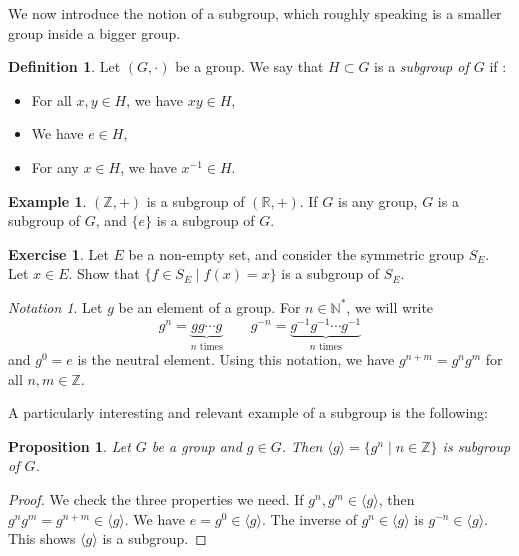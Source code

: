 \documentclass{book}
\newcommand{\N}{\mathbb{N}}
\newcommand{\Z}{\mathbb{Z}}
\newcommand{\R}{\mathbb{R}}
\theoremstyle{plain}
\newtheorem{proposition}[theorem]{Proposition}
\theoremstyle{definition}
\newtheorem{definition}[theorem]{Definition}
\newtheorem{example}[theorem]{Example}
\newtheorem{exercise}{Exercise}[section]
\theoremstyle{remark}
\newtheorem*{notation}{Notation}
\begin{document}
We now introduce the notion of a subgroup, which roughly speaking is a smaller group inside a bigger group. 

\begin{definition}
    Let $(G,\cdot)$ be a group. We say that $H \subset G$ is a \emph{subgroup of $G$} if :
    \begin{itemize}
        \item For all $x,y \in H$, we have $xy \in H$,
        \item We have $e \in H$,
        \item For any $x \in H$, we have $x^{-1} \in H$.
    \end{itemize}
\end{definition}

\begin{example}
    $(\Z,+)$ is a subgroup of $(\R,+)$. If $G$ is any group, $G$ is a subgroup of $G$, and $\{e\}$ is a subgroup of $G$.
\end{example}

\begin{exercise}
    Let $E$ be a non-empty set, and consider the symmetric group $S_E$. Let $x \in E$. Show that $\{f \in S_E \mid f(x) = x\}$ is a subgroup of $S_E$.
\end{exercise}

\begin{notation}
    Let $g$ be an element of a group. For $n \in \N^*$, we will write
    \[g^n = \underbrace{gg \cdots g}_{n \text{ times}} \qquad g^{-n} = \underbrace{g^{-1}g^{-1} \cdots g^{-1}}_{n \text{ times}}\]
    and $g^0 = e$ is the neutral element. Using this notation, we have $g^{n+m} = g^n g^m$ for all $n,m \in \Z$.
\end{notation}

A particularly interesting and relevant example of a subgroup is the following:

\begin{proposition}
    Let $G$ be a group and $g \in G$. Then $\langle g \rangle = \{g^n \mid n \in \Z\}$ is subgroup of $G$.
\end{proposition}

\begin{proof}
    We check the three properties we need. If $g^n,g^m \in \langle g \rangle$, then $g^n g^m = g^{n+m} \in \langle g \rangle$. We have $e = g^0 \in \langle g \rangle$. The inverse of $g^n \in \langle g \rangle$ is $g^{-n} \in \langle g \rangle$. This shows $\langle g \rangle$ is a subgroup.
\end{proof}
\end{document}
